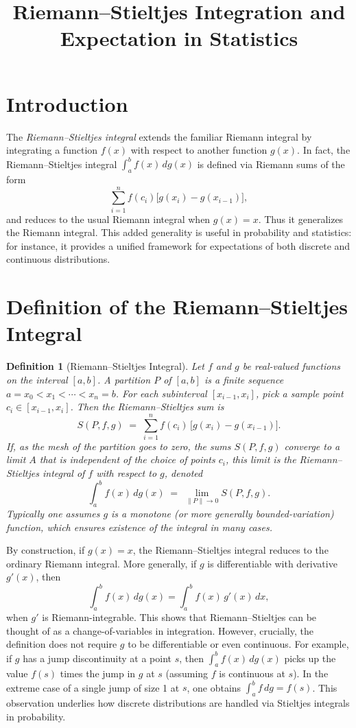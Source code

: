 \documentclass[11pt,a4paper]{article}
\newtheorem{definition}{Definition}[section]
\begin{document}
\title{Riemann--Stieltjes Integration and Expectation in Statistics}
\author{}
\date{}
\maketitle

\section{Introduction}
The {\em Riemann--Stieltjes integral} extends the familiar Riemann integral by integrating a function $f(x)$ with respect to another function $g(x)$.  In fact, the Riemann--Stieltjes integral $\int_a^b f(x)\,dg(x)$ is defined via Riemann sums of the form 
\[
\sum_{i=1}^n f(c_i)\bigl[g(x_i)-g(x_{i-1})\bigr],
\]
and reduces to the usual Riemann integral when $g(x)=x$.  Thus it generalizes the Riemann integral.  This added generality is useful in probability and statistics: for instance, it provides a unified framework for expectations of both discrete and continuous distributions. 

\section{Definition of the Riemann--Stieltjes Integral}
\begin{definition}[Riemann--Stieltjes Integral]
Let $f$ and $g$ be real-valued functions on the interval $[a,b]$.  A {\em partition} $P$ of $[a,b]$ is a finite sequence $a = x_0 < x_1 < \cdots < x_n = b$.  For each subinterval $[x_{i-1},x_i]$, pick a sample point $c_i \in [x_{i-1},x_i]$.  Then the Riemann--Stieltjes sum is 
\[
S(P,f,g) \;=\; \sum_{i=1}^n f(c_i)\,\bigl[g(x_i)-g(x_{i-1})\bigr].
\]
If, as the mesh of the partition goes to zero, the sums $S(P,f,g)$ converge to a limit $A$ that is independent of the choice of points $c_i$, this limit is the Riemann--Stieltjes integral of $f$ with respect to $g$, denoted 
\[
\int_a^b f(x)\,dg(x) \;=\; \lim_{\|P\|\to 0} S(P,f,g).
\]
Typically one assumes $g$ is a monotone (or more generally bounded-variation) function, which ensures existence of the integral in many cases.  
\end{definition}
By construction, if $g(x)=x$, the Riemann--Stieltjes integral reduces to the ordinary Riemann integral.  More generally, if $g$ is differentiable with derivative $g'(x)$, then 
\[
\int_a^b f(x)\,dg(x) 
=\int_a^b f(x)\,g'(x)\,dx,
\]
when $g'$ is Riemann-integrable.  This shows that Riemann--Stieltjes can be thought of as a change-of-variables in integration.  However, crucially, the definition does not require $g$ to be differentiable or even continuous.  For example, if $g$ has a jump discontinuity at a point $s$, then $\int_a^b f(x)\,dg(x)$ picks up the value $f(s)$ times the jump in $g$ at $s$ (assuming $f$ is continuous at $s$).  In the extreme case of a single jump of size 1 at $s$, one obtains $\int_a^b f\,dg=f(s)$.  This observation underlies how discrete distributions are handled via Stieltjes integrals in probability.
\end{document}

